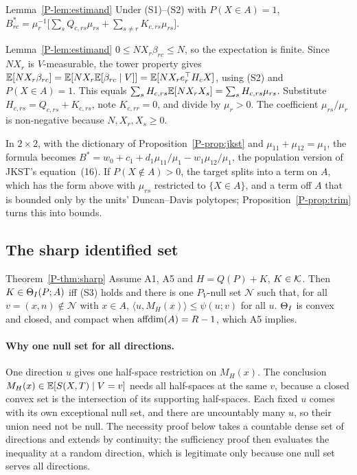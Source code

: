 \begin{restate}{Lemma~\ref{P-lem:estimand}}
Under (S1)--(S2) with $P(X\in A)=1$,
$B^*_{rc}=\mu_r^{-1}\big[\sum_sQ_{c,rs}\mu_{rs}+\sum_{s\ne r}K_{c,rs}\mu_{rs}\big]$.
\end{restate}
\begin{proofof}{Lemma~\ref{P-lem:estimand}}
$0\le NX_r\beta_{rc}\le N$, so the expectation is finite. Since $NX_r$ is
$V$-measurable, the tower property gives
$\mathbb E[NX_r\beta_{rc}]=\mathbb E[NX_r\mathbb E[\beta_{rc}\mid V]]=\mathbb E[NX_re_r^\top H_cX]$, using (S2)
and $P(X\in A)=1$. This equals $\sum_sH_{c,rs}\mathbb E[NX_rX_s]=\sum_sH_{c,rs}\mu_{rs}$.
Substitute $H_{c,rs}=Q_{c,rs}+K_{c,rs}$, note $K_{c,rr}=0$, and divide by
$\mu_r>0$. The coefficient $\mu_{rs}/\mu_r$ is non-negative because $N,X_r,X_s\ge0$.
\end{proofof}

In $2\times2$, with the dictionary of Proposition~\ref{P-prop:jkst} and
$\mu_{11}+\mu_{12}=\mu_1$, the formula becomes
$B^*=w_0+c_1+d_1\mu_{11}/\mu_1-w_1\mu_{12}/\mu_1$, the population version of JKST's
equation~(16). If $P(X\notin A)>0$, the target splits into a term on $A$, which has
the form above with $\mu_{rs}$ restricted to $\{X\in A\}$, and a term off $A$ that is
bounded only by the units' Duncan--Davis polytopes; Proposition~\ref{P-prop:trim}
turns this into bounds.

\subsection{The sharp identified set}

\begin{restate}{Theorem~\ref{P-thm:sharp}}
Assume A1, A5 and $H=Q(P)+K$, $K\in\mathcal K$. Then $K\in\Theta_I(P;A)$ iff (S3) holds and
there is one $P_V$-null set $\mathcal N$ such that, for all $v=(x,n)\notin\mathcal N$
with $x\in A$, $\langle u,M_H(x)\rangle\le\psi(u;v)$ for all $u$. $\Theta_I$ is convex
and closed, and compact when $\operatorname{affdim}(A)=R-1$, which A5 implies.
\end{restate}

\paragraph{Why one null set for all directions.} One direction $u$ gives one
half-space restriction on $M_H(x)$. The conclusion $M_H(x)\in\mathbb E[S(X,T)\mid V=v]$
needs all half-spaces at the same $v$, because a closed convex set is the
intersection of its supporting half-spaces. Each fixed $u$ comes with its own
exceptional null set, and there are uncountably many $u$, so their union need not be
null. The necessity proof below takes a countable dense set of directions and
extends by continuity; the sufficiency proof then evaluates the inequality at a
random direction, which is legitimate only because one null set serves all
directions.

